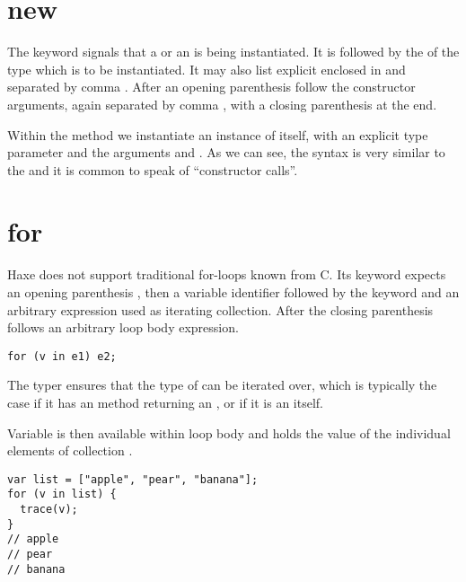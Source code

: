 \section{new}
\label{expression-new}

The  keyword signals that a  or an  is being instantiated. It is followed by the  of the type which is to be instantiated. It may also list explicit  enclosed in \expr{<>} and separated by comma \expr{,}. After an opening parenthesis \expr{(} follow the constructor arguments, again separated by comma \expr{,}, with a closing parenthesis \expr{)} at the end.


Within the  method we instantiate an instance of  itself, with an explicit type parameter  and the arguments  and . As we can see, the syntax is very similar to the  and it is common to speak of ``constructor calls''.



\section{for}
\label{expression-for}

Haxe does not support traditional for-loops known from C. Its  keyword expects an opening parenthesis \expr{(}, then a variable identifier followed by the keyword  and an arbitrary expression used as iterating collection. After the closing parenthesis \expr{)} follows an arbitrary loop body expression.

\begin{lstlisting}
for (v in e1) e2;
\end{lstlisting}

The typer ensures that the type of  can be iterated over, which is typically the case if it has an   method returning an , or if it is an  itself.

Variable  is then available within loop body  and holds the value of the individual elements of collection .

\begin{lstlisting}
var list = ["apple", "pear", "banana"];
for (v in list) {
  trace(v);
}
// apple
// pear
// banana
\end{lstlisting}


